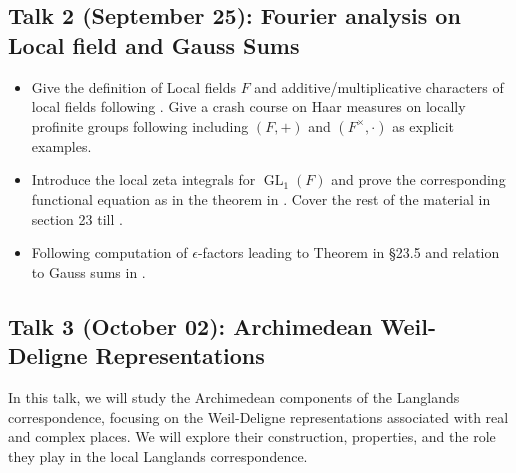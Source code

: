\documentclass[11pt]{amsart}
\DeclareMathOperator{\Gl}{GL}
\begin{document}
\subsection{Talk 2 (September 25): Fourier analysis on Local field and Gauss Sums}
\begin{itemize}
    \item Give the definition of Local fields $F$ and additive/multiplicative characters of local fields following \cite[\S 1.1 - 1.4, \S 1.6-1.8]{BH06}. Give a crash course on Haar measures on locally profinite groups following \cite[\S 3.1-3.4]{BH06} including $(F,+)$ and $(F^\times,\cdot)$ as explicit examples.
    
    \item Introduce the local zeta integrals for $\Gl_1(F)$ and prove the corresponding functional equation as in the theorem in \cite[\S 23.1-23.2]{BH06}. Cover the rest of the material in section 23 till \cite[\S 23.4]{BH06}.

    \item Following \cite[\S 23.5-23.7]{BH06} computation of $\epsilon$-factors leading to Theorem in \S 23.5 and relation to Gauss sums in \cite[\S 23.6]{BH06}.
    
\end{itemize}

\subsection{Talk 3 (October 02): Archimedean Weil-Deligne Representations}
In this talk, we will study the Archimedean components of the Langlands correspondence, focusing on the Weil-Deligne representations associated with real and complex places. We will explore their construction, properties, and the role they play in the local Langlands correspondence.
\end{document}
